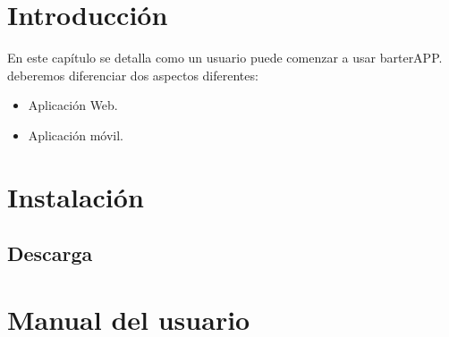 
\section{Introducción}\label{introduccion-usuario}
En este capítulo se detalla como un usuario puede comenzar a usar barterAPP. 
deberemos diferenciar dos aspectos diferentes:

\begin{itemize}
\tightlist
\item
  Aplicación Web.
\item
  Aplicación móvil.
\end{itemize}

\section{Instalación}\label{instalacion-app}
\subsection{Descarga}\label{descarga}

\section{Manual del usuario}\label{manual-usuario}


